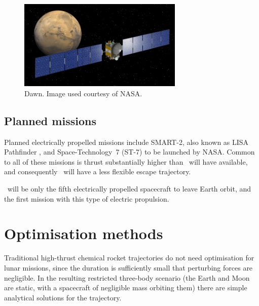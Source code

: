 \begin{figure}[ht]
\centering
\includegraphics  [width=0.7\textwidth] {Images/mars-browse.jpg}
\caption{Dawn. Image used courtesy of NASA.}
\label{fig:Dawn}
\end{figure}

\subsection{Planned missions}
Planned electrically propelled missions include SMART-2, also known as LISA Pathfinder \parencite{web_SMART-2}, and Space-Technology~7 (ST-7) to be launched by NASA. Common to all of these missions is thrust substantially higher than \BW\ will have available, and consequently \BW\ will have a less flexible escape trajectory.

\BW\ will be only the fifth electrically propelled spacecraft to leave Earth orbit, and the first mission with this type of electric propulsion.




\section{Optimisation methods} \label{sec:Optimisation-methods}




Traditional high-thrust chemical rocket trajectories do not need optimisation for lunar missions, since the duration is sufficiently small that perturbing forces are negligible. In the resulting restricted three-body scenario (the Earth and Moon are static, with a spacecraft of negligible mass orbiting them) there are simple analytical solutions for the trajectory.

